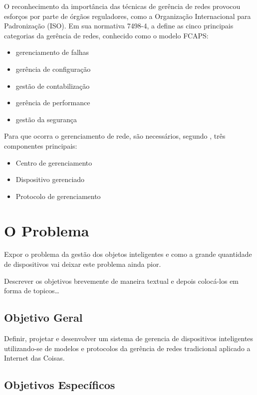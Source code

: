 \documentclass[twoside,english,brazilian]{UNISINOSmonografia}
\begin{document}
	O reconhecimento da importância das técnicas de gerência de redes provocou 
	esforços por parte de órgãos reguladores, como a Organização Internacional 
	para Padronização (ISO). Em sua normativa 7498-4, a  
	define as cinco principais categorias da gerência de redes, conhecido como 
	o modelo FCAPS:
	
	\begin{itemize}
		\item gerenciamento de falhas
		\item gerência de configuração
		\item gestão de contabilização
		\item gerência de performance
		\item gestão da segurança
	\end{itemize}
	
	Para que ocorra o gerenciamento de rede, são necessários, segundo 
	\cite{Ding2009}, três componentes principais:
	
	\begin{itemize}
		\item Centro de gerenciamento
		\item Dispositivo gerenciado
		\item Protocolo de gerenciamento
	\end{itemize}

\section{O Problema}

	Expor o problema da gestão dos objetos inteligentes e como a grande 
	quantidade
	de dispositivos vai deixar este problema ainda pior.
		
	Descrever os objetivos brevemente de maneira textual e depois colocá-los em
	forma de topicos\ldots


	\subsection{Objetivo Geral}
	
		Definir, projetar e desenvolver um sistema de gerencia de dispositivos 
		inteligentes utilizando-se de modelos e protocolos da gerência de 
		redes tradicional aplicado a Internet das Coisas.
	
	
	\subsection{Objetivos Específicos}
	
\end{document}
